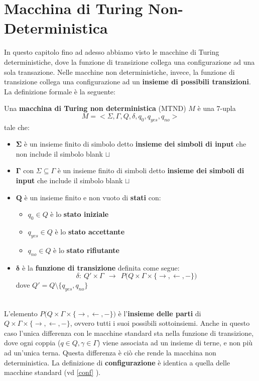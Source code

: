 \section{Macchina di Turing Non-Deterministica}
In questo capitolo fino ad adesso abbiamo visto le macchine di Turing deterministiche, dove la funzione di transizione collega una configurazione ad una sola transazione.
Nelle macchine non deterministiche, invece, la funzione di transizione collega una configurazione ad un \textbf{insieme di possibili transizioni}.\\
La definizione formale è la seguente:\smallskip\\
\colorbox{SALZO}{\parbox{\dimexpr\linewidth-2\fboxsep}{\begin{definition}
   Una \textbf{macchina di Turing non deterministica} (MTND) $M$ è una 7-upla 
   \[M = <\Sigma, \Gamma,Q,\delta,q_0,q_{yes}, q_{no}>\] 
   tale che:
   \begin{itemize}
    \item $\bm{\Sigma}$ è un insieme finito di simbolo detto \textbf{insieme dei simboli di input} che non include il simbolo blank $\sqcup$
    \item $\bm{\Gamma}$ con $\Sigma \subseteq \Gamma$ è un insieme finito di simboli detto \textbf{insieme dei simboli di input} che include il simbolo blank $\sqcup$
    \item $\bm{Q}$ è un insieme finito e non vuoto di \textbf{stati} con:
        \begin{itemize}
            \item $q_0 \in Q$ è lo \textbf{stato iniziale}
            \item $q_{yes}\in Q$ è lo \textbf{stato accettante}
            \item $q_{no} \in Q$ è lo \textbf{stato rifiutante}
        \end{itemize}
    \item $\bm{\delta}$ è la \textbf{funzione di transizione} definita come segue:
    \[  \delta:\ Q' \times \Gamma \ \ \to \ \ P\Big(   Q \times \Gamma \times \{  \rightarrow, \leftarrow, -  \}         \Big)  \]
    dove $Q' = Q \setminus \{  q_{yes}, q_{no}    \}$
   \end{itemize}
\end{definition}}}\smallskip\\
L'elemento $P\Big(   Q \times \Gamma \times \{  \rightarrow, \leftarrow, -  \}         \Big)$ è l'\textbf{insieme delle parti} di $Q \times \Gamma \times \{  \rightarrow, \leftarrow, -  \}$, ovvero tutti i suoi possibili 
sottoinsiemi. Anche in questo caso l'unica differenza con le macchine standard sta nella funzione di transizione, dove ogni coppia ($q \in Q, \gamma \in \Gamma $) viene associata ad un insieme di terne, e non più ad un'unica terna.
Questa differenza è ciò che rende la macchina non deterministica. La definizione di \textbf{configurazione} è identica a quella delle macchine standard (vd \ref{conf} ).    




